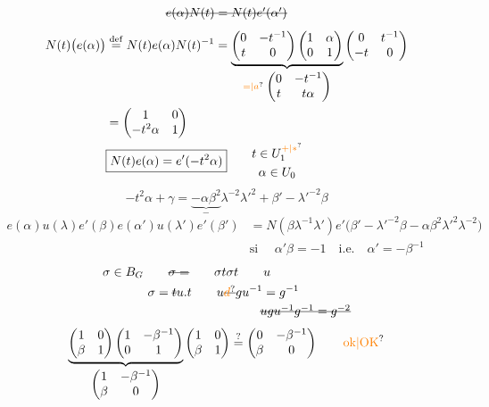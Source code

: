 \[
\deleted{e(\alpha)N(t)=N(t)e'(\alpha')}
\]
\[
\begin{aligned}
 N(t)\bigl(e(\alpha)\bigr)&\overset{\mathrm{def}}=N(t)e(\alpha)N(t)^{-1}
 =\underbrace{\begin{pmatrix}0&-t^{-1}\\t&0\end{pmatrix}\begin{pmatrix}1&\alpha\\0&1\end{pmatrix}}_{\unsure{=|a}\;\begin{pmatrix}0&-t^{-1}\\t&t\alpha\end{pmatrix}}\begin{pmatrix}0&t^{-1}\\-t&0\end{pmatrix}\\
 &=\begin{pmatrix}1&0\\-t^2\alpha&1\end{pmatrix}\\
 &\boxed{N(t)e(\alpha)=e'(-t^2\alpha)}\qquad\begin{gathered}t\in U_1^{\unsure{+|\ast}}\\\alpha\in U_0\end{gathered}
\end{aligned}
\]
\[
-t^2\alpha+\gamma=\underbrace{-\alpha\beta^2}_{-}\lambda^{-2}{\lambda'}^2+\beta'-{\lambda'}^{-2}\beta
\]
\[
\begin{aligned}
e(\alpha)u(\lambda)e'(\beta)e(\alpha')u(\lambda')e'(\beta')&=\boxed{N(\beta\lambda^{-1}\lambda')e'\bigl(\beta'-{\lambda'}^{-2}\beta-\alpha\beta^2{\lambda'}^2\lambda^{-2}\bigr)}\\
&\text{si }\quad \alpha'\beta=-1\quad\text{i.e.}\quad \alpha'=-\beta^{-1}
\end{aligned}
\]
\[
\begin{aligned}
\sigma&\in{B_G}\qquad\deleted{\sigma=}\qquad \sigma t\sigma t\qquad u\\
&\hspace{3em}\sigma=\deleted{t}u.t\qquad u\deleted{\unsure{d}}gu^{-1}=g^{-1}\\
&\hspace{12em}\deleted{ugu^{-1}g^{-1}=g^{-2}}
\end{aligned}
\]
\[
\underbrace{\begin{pmatrix}1&0\\\beta&1\end{pmatrix}\begin{pmatrix}1&-\beta^{-1}\\0&1\end{pmatrix}}_{\begin{pmatrix}1&-\beta^{-1}\\\beta&0\end{pmatrix}}\begin{pmatrix}1&0\\\beta&1\end{pmatrix}
\overset{?}=\begin{pmatrix}0&-\beta^{-1}\\\beta&0\end{pmatrix}\qquad\text{\unsure{ok|OK}}
\]
